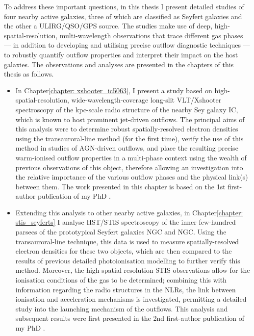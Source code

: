 To address these important questions, in this thesis I present detailed studies of four nearby active galaxies, three of which are classified as Seyfert galaxies and the other a ULIRG/QSO/GPS source. The studies make use of deep, high-spatial-resolution, multi-wavelength observations that trace different gas phases --- in addition to developing and utilising precise outflow diagnostic techniques --- to robustly quantify outflow properties and interpret their impact on the host galaxies. The observations and analyses are presented in the chapters of this thesis as follows. \\

\begin{itemize}
    \item In Chapter\;\ref{chapter: xshooter_ic5063}, I present a study based on high-spatial-resolution, wide-wavelength-coverage long-slit VLT/Xshooter spectroscopy of the kpc-scale radio structure of the nearby Sey galaxy IC, which is known to host prominent jet-driven outflows. The principal aims of this analysis were to determine robust spatially-resolved electron densities using the transauroral-line method (for the first time), verify the use of this method in studies of AGN-driven outflows, and place the resulting precise warm-ionised outflow properties in a multi-phase context using the wealth of previous observations of this object, therefore allowing an investigation into the relative importance of the various outflow phases and the physical link(s) between them. The work presented in this chapter is based on the 1st first-author publication of my PhD \citep{Holden2023}.
    \item Extending this analysis to other nearby active galaxies, in Chapter\;\ref{chapter: stis_seyferts} I analyse HST/STIS spectroscopy of the inner few-hundred parsecs of the prototypical Seyfert galaxies NGC and NGC. Using the transauroral-line technique, this data is used to measure spatially-resolved electron densities for these two objects, which are then compared to the results of previous detailed photoionisation modelling to further verify this method. Moreover, the high-spatial-resolution STIS observations allow for the ionisation conditions of the gas to be determined; combining this with information regarding the radio structures in the NLRs, the link between ionisation and acceleration mechanisms is investigated, permitting a detailed study into the launching mechanism of the outflows. This analysis and subsequent results were first presented in the 2nd first-author publication of my PhD \citep{HoldenTadhunter2023}.

\end{itemize}
